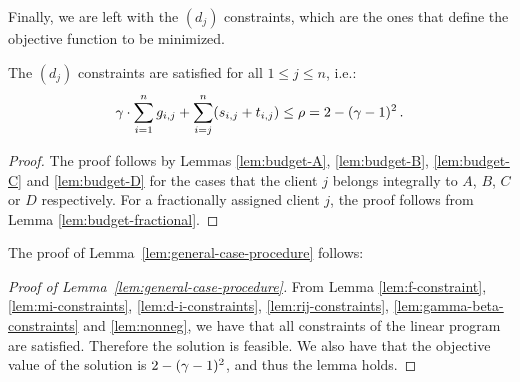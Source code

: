 Finally, we are left with the $(d_j)$ constraints, which are the ones that define the objective function to be minimized.


\begin{lemma}\label{lem:d-i-constraints}
    The $(d_{j})$ constraints are satisfied for all $1 \leq j \leq n$, i.e.:
    \begin{equation*}
        \gamma\cdot \sum_{i=1}^n g_{i,j} + \sum_{i=j}^n (s_{i,j} + t_{i,j}) \leq \rho = 2-(\gamma-1)^2\,.
    \end{equation*}
\end{lemma}
\begin{proof}
    The proof follows by Lemmas \ref{lem:budget-A}, \ref{lem:budget-B}, \ref{lem:budget-C} and \ref{lem:budget-D} for the cases that the client $j$ belongs integrally to $A$, $B$, $C$ or $D$ respectively. For a fractionally assigned client $j$, the proof follows from Lemma \ref{lem:budget-fractional}.
\end{proof}

The proof of Lemma~\ref{lem:general-case-procedure} follows:


\begin{proof}[Proof of Lemma~\ref{lem:general-case-procedure}]
    From Lemma \ref{lem:f-constraint}, \ref{lem:mi-constraints}, \ref{lem:d-i-constraints}, \ref{lem:rij-constraints}, \ref{lem:gamma-beta-constraints} and \ref{lem:nonneg}, we have that all constraints of the linear program are satisfied. Therefore the solution is feasible. We also have that the objective value of the solution is $2-(\gamma-1)^2$, and thus the lemma holds.
\end{proof}
